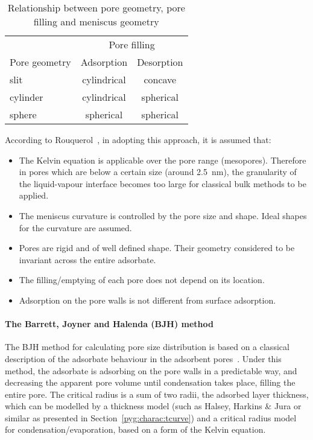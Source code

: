 \begin{table}[htb]
	\centering
	\caption{Relationship between pore geometry, pore filling and meniscus geometry}%
	\label{pyg:tab:kelvin-meniscus}
	\begin{tabular}{lcc}
		\toprule
		              & \multicolumn{2}{c}{Pore filling}              \\
		\cmidrule{2-3}
		Pore geometry & Adsorption                       & Desorption \\
		\midrule
		slit          & cylindrical                      & concave    \\
		cylinder      & cylindrical                      & spherical  \\
		sphere        & spherical                        & spherical  \\
		\bottomrule
	\end{tabular}
\end{table}

According to Rouquerol~\cite{rouquerolAdsorptionPowdersPorous2013},
in adopting this approach, it is assumed that:

\begin{itemize}

	\item The Kelvin equation is applicable over the pore
	      range (mesopores). Therefore in pores which are below a
	      certain size (around \SI{2.5}{\nano\meter}), the granularity
	      of the liquid-vapour interface becomes too large for classical
	      bulk methods to be applied.
	\item The meniscus curvature is controlled by the pore size and
	      shape. Ideal shapes for the curvature are assumed.
	\item Pores are rigid and of well defined shape. Their geometry
	      considered to be invariant across the entire adsorbate.
	\item The filling/emptying of each pore does not depend on its location.
	\item Adsorption on the pore walls is not different from
	      surface adsorption.

\end{itemize}

\paragraph{The Barrett, Joyner and Halenda (BJH) method}

The BJH method for calculating pore size distribution
is based on a classical description of the adsorbate behaviour
in the adsorbent pores~\cite{barrettDeterminationPoreVolume1951}.
Under this method, the adsorbate is adsorbing on the pore walls
in a predictable way, and decreasing the apparent pore volume until
condensation takes place, filling the entire pore. The critical radius
is a sum of two radii, the adsorbed layer thickness, which can be
modelled by a thickness model (such as Halsey, Harkins \& Jura or similar
as presented in Section~\ref{pyg:charac:tcurve})
and a critical radius model for condensation/evaporation,
based on a form of the Kelvin equation.

